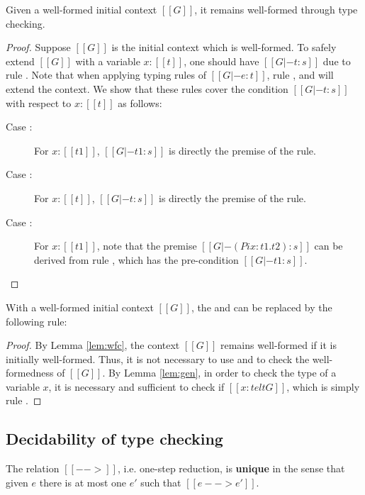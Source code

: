 \begin{lem}\label{lem:wfc}
	Given a well-formed initial context $[[G]]$, it remains well-formed through type checking.
\end{lem}

\begin{proof}
	Suppose $[[G]]$ is the initial context which is well-formed. To safely extend $[[G]]$ with a variable $x:[[t]]$, one should have $[[G |- t:s]]$ due to rule . Note that when applying typing rules of $[[G |- e:t]]$, rule ,  and  will extend the context. We show that these rules cover the condition $[[G |- t:s]]$ with respect to $x:[[t]]$ as follows:
	\begin{description}
		\item[Case :] \ottusedrule{\ottdruleTXXPi{}} For $x:[[t1]]$, $[[G |- t1:s]]$ is directly the premise of the rule.
		\item[Case :] \ottusedrule{\ottdruleTXXMu{}} For $x:[[t]]$, $[[G |- t:s]]$ is directly the premise of the rule.
		\item[Case :] \ottusedrule{\ottdruleTXXLam{}} For $x:[[t1]]$, note that the premise $[[G |- (Pi x:t1.t2):s]]$ can be derived from rule , which has the pre-condition $[[G |- t1:s]]$.
	\end{description}
\end{proof}

\begin{lem}\label{lem:wfcopt}
	With a well-formed initial context $[[G]]$, the  and  can be replaced by the following rule: \ottusedrule{\ottdruleTSXXVar{}}
\end{lem}

\begin{proof}
	By Lemma \ref{lem:wfc}, the context $[[G]]$ remains well-formed if it is initially well-formed. Thus, it is not necessary to use  and  to check the well-formedness of $[[G]]$. By Lemma \ref{lem:gen}, in order to check the type of a variable $x$, it is necessary and sufficient to check if $[[x:t elt G]]$, which is simply rule .
\end{proof}

\subsection{Decidability of type checking}
\begin{lem}\label{lem:unired}
	The relation $[[-->]]$, i.e. one-step reduction, is \textbf{unique} in the sense that given $e$ there is at most one $e'$ such that $[[e --> e']]$.
\end{lem}

